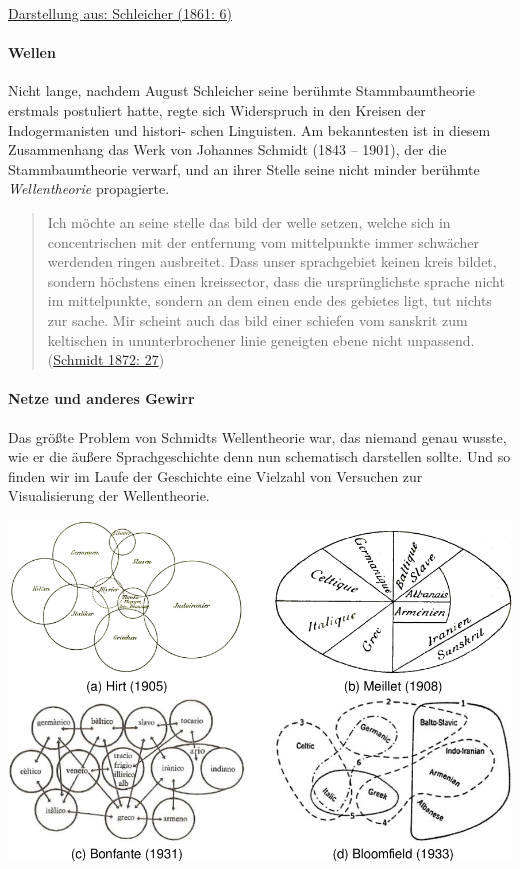\href{http://bibliography.lingpy.org?key=Schleicher1861}{Darstellung
aus: Schleicher (1861: 6)}





\paragraph{Wellen}

Nicht lange, nachdem August Schleicher seine berühmte Stammbaumtheorie
erstmals postuliert hatte, regte sich Widerspruch in den Kreisen der
Indogermanisten und histori- schen Linguisten. Am bekanntesten ist in
diesem Zusammenhang das Werk von Johannes Schmidt (1843 -- 1901), der
die Stammbaumtheorie verwarf, und an ihrer Stelle seine nicht minder
berühmte \emph{Wellentheorie} propagierte.






\begin{quote}
Ich möchte an seine stelle das bild der welle setzen, welche sich in
concentrischen mit der entfernung vom mittelpunkte immer schwächer
werdenden ringen ausbreitet. Dass unser sprachgebiet keinen kreis
bildet, sondern höchstens einen kreissector, dass die ursprünglichste
sprache nicht im mittelpunkte, sondern an dem einen ende des gebietes
ligt, tut nichts zur sache. Mir scheint auch das bild einer schiefen vom
sanskrit zum keltischen in ununterbrochener linie geneigten ebene nicht
unpassend.
(\href{http://bibliography.lingpy.org?key=Schmidt1872}{Schmidt 1872:
27})
\end{quote}





\paragraph{Netze und anderes Gewirr}

Das größte Problem von Schmidts Wellentheorie war, das niemand genau
wusste, wie er die äußere Sprachgeschichte denn nun schematisch
darstellen sollte. Und so finden wir im Laufe der Geschichte eine
Vielzahl von Versuchen zur Visualisierung der Wellentheorie.






\href{img/netze.png}{\includegraphics[width=\textwidth]{img/netze.png}}




